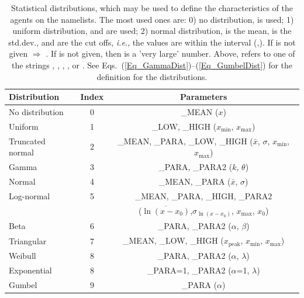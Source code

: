 \documentclass[12pt,a4paper,final,twoside]{stylevk}
\begin{document}
%
\begin{table}[!tp]
\begin{center}
\caption{Statistical distributions, which may be used to define the
  characteristics of the agents on the  namelists.  The
  most used ones are: 0) no distribution,  is used; 1)
  uniform distribution,  and  are used;
  2) normal distribution,  is the mean, 
  is the std.dev.,  and  are the cut
  offs, \emph{i.e.}, the values are within the interval
  (,).  If  is not given
  $\Rightarrow$ .  If  is not given,
  then  is a 'very large' number.  Above, 
  refers to one of the strings , , ,
  , or .  See
  Eqs.~(\ref{Eq_GammaDist})--(\ref{Eq_GumbelDist}) for the definition for
  the distributions.}\label{Table_StatDists}
\vspace{12pt}
\begin{tabular}{l|c|c} \hline \hline
Distribution     & Index & Parameters \\ \hline 
No distribution  & 0 & \_MEAN ($x$) \\
Uniform          & 1 & \_LOW, \_HIGH ($x_\mathrm{min}$, $x_\mathrm{max}$) \\ 
Truncated normal & 2 & \_MEAN, \_PARA, \_LOW, \_HIGH ($\bar{x}$,
$\sigma$, $x_\mathrm{min}$, $x_\mathrm{max}$)  \\ 
Gamma            & 3 & \_PARA, \_PARA2 ($k$, $\theta$) \\ 
Normal           & 4 & \_MEAN, \_PARA ($\bar{x}$, $\sigma$) \\ 
Log-normal       & 5 & \_MEAN, \_PARA, \_HIGH, \_PARA2 \\  
                 &   & ($\overline{\ln(x-x_0)}$,$\sigma_{\ln(x-x_0)}$,
                 $x_\mathrm{max}$, $x_0$) \\
Beta             & 6 & \_PARA, \_PARA2 ($\alpha$, $\beta$) \\ 
Triangular       & 7 & \_MEAN, \_LOW, \_HIGH ($x_\mathrm{peak}$,
$x_\mathrm{min}$, $x_\mathrm{max}$) \\  
Weibull          & 8 & \_PARA, \_PARA2 ($\alpha$, $\lambda$) \\ 
Exponential      & 8 & \_PARA=1, \_PARA2 ($\alpha$=1, $\lambda$) \\ 
Gumbel           & 9 & \_PARA ($\alpha$) \\ \hline \hline
\end{tabular}
\end{center}
\end{table}
%
\end{document}
